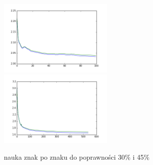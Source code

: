 \documentclass[11pt,leqno]{article}
\begin{document}
\begin{figure}[!h]
    \includegraphics[width=0.5\textwidth]{pictures/char_progress-1.png}
    \includegraphics[width=0.5\textwidth]{pictures/char_progress-2.png}
    \caption{nauka znak po znaku do poprawności 30\% i 45\%}
\end{figure}
\end{document}
